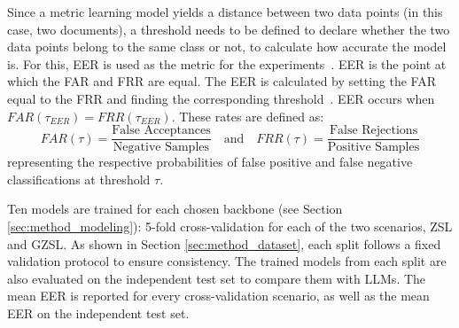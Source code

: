 Since a metric learning model yields a distance between two data points (in this case, two documents), a threshold needs to be defined to declare whether the two data points belong to the same class or not, to calculate how accurate the model is. For this, \acrfull{EER} is used as the metric for the experiments~\cite{agrawal_hybrid_2014}. \gls{EER} is the point at which the \gls{FAR} and \gls{FRR} are equal. The \gls{EER} is calculated by setting the \gls{FAR} equal to the \gls{FRR} and finding the corresponding threshold~\cite{hofbauer_calculating_2016}.
\gls{EER} occurs when $FAR(\tau_{EER}) = FRR(\tau_{EER})$. These rates are defined as:\begin{equation} \label{far}FAR(\tau) = \frac{\text{False Acceptances}}{\text{Negative Samples}} \quad \text{and} \quad FRR(\tau) = \frac{\text{False Rejections}}{\text{Positive Samples}}\end{equation}representing the respective probabilities of false positive and false negative classifications at threshold $\tau$.

Ten models are trained for each chosen backbone (see Section \ref{sec:method_modeling}): 5-fold cross-validation for each of the two scenarios, \gls{ZSL} and \gls{GZSL}. As shown in Section \ref{sec:method_dataset}, each split follows a fixed validation protocol to ensure consistency. The trained models from each split are also evaluated on the independent test set to compare them with \glspl{LLM}. The mean \gls{EER} is reported for every cross-validation scenario, as well as the mean \gls{EER} on the independent test set.
